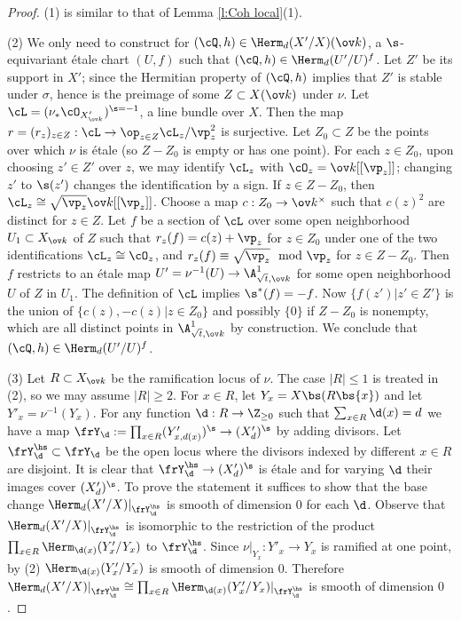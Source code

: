 \begin{proof}
(1) is similar to that of Lemma \ref{l:Coh local}(1).

(2) We only need to construct for $(\cQ,h)\in \Herm_{d}(X'/X)(\ov k)$, a $\s$-equivariant \'etale chart $(U,f)$ such that $(\cQ,h)\in \Herm_{d}(U'/U)^{f}$. Let $Z'$ be its support  in $X'$; since the Hermitian property of $(\cQ, h)$ implies that $Z'$ is stable under $\sigma$, hence is the preimage of some $Z\subset X(\ov k)$ under $\nu$. Let $\cL=(\nu_{*}\cO_{X'_{\ov k}})^{\s=-1}$, a line bundle over $X$. Then the map $r=(r_{z})_{z\in Z}: \cL\to \op_{z\in Z}\cL_{z}/\vp_{z}^{2}$ is surjective. Let $Z_{0}\subset Z$ be the points over which $\nu$ is \'etale (so $Z-Z_{0}$ is empty or has one point). For each $z\in Z_{0}$, upon choosing $z'\in Z'$ over $z$, we may identify $\cL_{z}$ with $\cO_{z}=\ov k[[\vp_{z}]]$; changing $z'$ to $\s(z')$ changes the identification by a sign.  If $z\in Z-Z_{0}$, then $\cL_{z}\cong \sqrt{\vp_{z}}\ov k[[\vp_{z}]]$. Choose a map $c:Z_{0}\to \ov k^{\times}$ such that $c(z)^{2}$ are distinct for $z\in Z$. Let $f$ be a section of $\cL$ over some open neighborhood $U_{1}\subset X_{\ov k}$ of $Z$ such that $r_{z}(f)=c(z)+\vp_{z}$ for $z\in Z_{0}$ under one of the two identifications $\cL_{z}\cong \cO_{z}$, and $r_{z}(f)\equiv\sqrt{\vp_{z}}\mod\vp_{z}$ for $z\in Z-Z_{0}$.  Then $f$ restricts to an \'etale map $U'=\nu^{-1}(U)\to \A^{1}_{\sqrt{t},\ov k}$ for some open neighborhood $U$ of $Z$ in $U_{1}$. The definition of $\cL$ implies $\s^{*}(f)=-f$. Now $\{f(z')|z'\in Z'\}$ is the union of $\{c(z),-c(z)|z\in Z_{0}\}$ and possibly $\{0\}$ if $Z-Z_{0}$ is nonempty, which are all distinct points in $\A^{1}_{\sqrt{t},\ov k}$ by construction. We conclude that $(\cQ,h)\in \Herm_{d}(U'/U)^{f}$. %

(3) Let $R\subset X_{\ov k}$ be the ramification locus of $\nu$. The case $|R|\le 1$ is treated in (2), so we may assume $|R|\ge2$. For $x\in R$, let $Y_{x}=X\bs (R\bs \{x\})$ and let $Y'_{x}=\nu^{-1}(Y_{x})$.   For any function $\d:R\to \Z_{\ge0}$ such that $\sum_{x\in R} \d(x)=d$ we have a map $\frY_{\d}:=\prod_{x\in R}(Y'_{x,d(x)})^{\s}\to (X'_{d})^{\s}$ by adding divisors. Let $\frY_{\d}^{\hs}\subset \frY_{\d}$ be the open locus where the divisors indexed by different $x\in R$ are disjoint. It is clear that $\frY^{\hs}_{\d}\to (X'_{d})^{\s}$ is \'etale and for varying $\d$ their images cover $(X'_{d})^{\s}$. To prove the statement it suffices to show that the base change $\Herm_{d}(X'/X)|_{\frY_{\d}^{\hs}}$ is smooth of dimension $0$ for each $\d$. Observe that $\Herm_{d}(X'/X)|_{\frY_{\d}^{\hs}}$ is isomorphic to the restriction of the product $\prod_{x\in R}\Herm_{\d(x)}(Y'_{x}/Y_{x})$ to $\frY_{\d}^{\hs}$. Since $\nu|_{Y_{x}}: Y'_{x}\to Y_{x}$ is ramified at one point, by (2) $\Herm_{\d(x)}(Y'_{x}/Y_{x})$ is smooth of dimension $0$. Therefore $\Herm_{d}(X'/X)|_{\frY_{\d}^{\hs}}\cong \prod_{x\in R}\Herm_{\d(x)}(Y'_{x}/Y_{x})|_{\frY_{\d}^{\hs}}$ is smooth of dimension $0$.
\end{proof}

